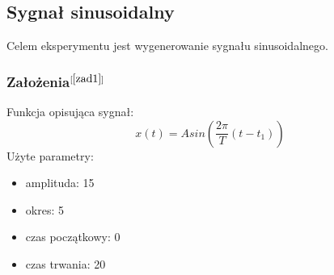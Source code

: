 \documentclass[12pt]{article}
\begin{document}
\subsection{Sygnał sinusoidalny}
Celem eksperymentu jest wygenerowanie sygnału sinusoidalnego.
\label{syg1}
\subsubsection{Założenia\( ^{[\ref{zad1}]}\)}
\label{wzor1}
Funkcja opisująca sygnał:
\begin{equation} 
x(t) = Asin(\frac{2\pi}{T}(t - t_1))
\end{equation}
Użyte parametry:
\begin{itemize}
\item amplituda: 15
\item okres: 5
\item czas początkowy: 0
\item czas trwania: 20
\end{itemize}
\end{document}
